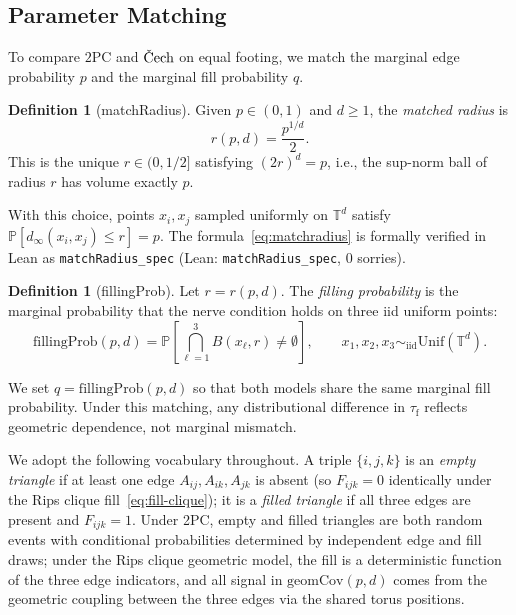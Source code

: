 \documentclass[reqno,12pt]{amsart}
\newcommand{\tauf}{\tau_{\mathrm{f}}}
\newcommand{\PC}{\mathrm{2PC}}
\newcommand{\Cech}{\ifmmode\text{\v{C}ech}\else\v{C}ech\fi}  %
\newcommand{\geomCov}{\mathrm{geomCov}}
\newcommand{\fillingP}{\mathrm{fillingProb}}
\newcommand{\TT}{\mathbb{T}}         %
\newcommand{\PP}{\mathbb{P}}
\newcommand{\lean}[1]{\textup{\texttt{\small #1}}}
\newcommand{\leanverified}[1]{\textup{(Lean: \texttt{#1}, 0 sorries)}}
\theoremstyle{plain}
\theoremstyle{definition}
\newtheorem{definition}[theorem]{Definition}
\theoremstyle{remark}
\begin{document}
\subsection{Parameter Matching}

To compare $\PC$ and $\Cech$ on equal footing, we match the marginal edge probability $p$
and the marginal fill probability $q$.

\begin{definition}[matchRadius]\label{def:matchradius}
Given $p\in(0,1)$ and $d\geq 1$, the \emph{matched radius} is
\begin{equation}\label{eq:matchradius}
  r(p,d) = \frac{p^{1/d}}{2}.
\end{equation}
This is the unique $r\in(0,1/2]$ satisfying $(2r)^d = p$, i.e., the sup-norm ball of radius
$r$ has volume exactly $p$.
\end{definition}

With this choice, points $x_i, x_j$ sampled uniformly on $\TT^d$ satisfy
$\PP[d_\infty(x_i,x_j)\leq r] = p$. The formula~\eqref{eq:matchradius} is formally verified
in Lean as \lean{matchRadius\_spec} \leanverified{matchRadius\_spec}.

\begin{definition}[fillingProb]\label{def:fillingprob}
Let $r = r(p,d)$. The \emph{filling probability} is the marginal probability that the
nerve condition holds on three iid uniform points:
\[
  \fillingP(p,d)
  = \PP\!\left[\bigcap_{\ell=1}^{3} B(x_\ell, r)\neq\emptyset\right],
  \qquad x_1,x_2,x_3\sim_{\mathrm{iid}}\mathrm{Unif}(\TT^d).
\]
\end{definition}

We set $q = \fillingP(p,d)$ so that both models share the same marginal fill probability.
Under this matching, any distributional difference in $\tauf$ reflects geometric dependence,
not marginal mismatch.

We adopt the following vocabulary throughout. A triple $\{i,j,k\}$ is an \emph{empty
triangle} if at least one edge $A_{ij},A_{ik},A_{jk}$ is absent (so $F_{ijk} = 0$
identically under the Rips clique fill~\eqref{eq:fill-clique}); it is a \emph{filled
triangle} if all three edges are present and $F_{ijk} = 1$. Under 2PC, empty and filled
triangles are both random events with conditional probabilities determined by independent
edge and fill draws; under the Rips clique geometric model, the fill is a deterministic
function of the three edge indicators, and all signal in $\geomCov(p,d)$ comes from the
geometric coupling between the three edges via the shared torus positions.
\end{document}
